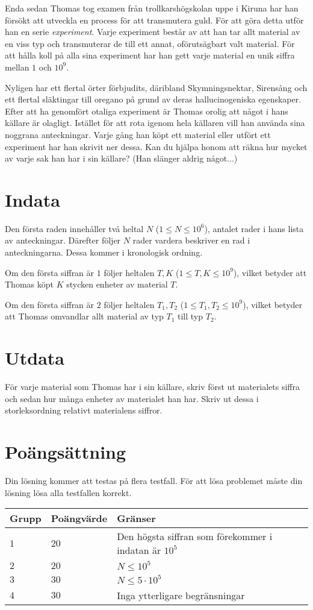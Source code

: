 Enda sedan Thomas tog examen från trollkarshögskolan uppe i Kiruna har han försökt att utveckla en process för att transmutera guld. För att göra detta utför
han en serie \textit{experiment}. Varje experiment består av att han tar allt material av en viss typ och transmuterar de till ett annat, oförutsägbart valt
material. För att hålla koll på alla sina experiment har han gett varje material en unik siffra mellan $1$ och $10^9$. 

Nyligen har ett flertal örter förbjudits, däribland Skymningsnektar, Sirensång och ett flertal släktingar till oregano på grund av deras
hallucinogeniska egenskaper. Efter att ha genomfört otaliga experiment är Thomas orolig att något i hans källare är olagligt. Istället för att rota
igenom hela källaren vill han använda sina noggrana anteckningar. Varje gång han köpt ett material eller utfört ett experiment har han skrivit ner dessa.
Kan du hjälpa honom att räkna hur mycket av varje sak han har i sin källare? (Han slänger aldrig något...)

\section*{Indata}
Den första raden innehåller två heltal $N$ ($1 \leq N \leq 10^6$), antalet rader i hans lista av anteckningar.
Därefter följer $N$ rader vardera beskriver en rad i anteckningarna. Dessa kommer i kronologisk ordning.

Om den första siffran är $1$ följer heltalen $T,K$ ($1 \leq T, K \leq 10^9$), vilket betyder att Thomas köpt $K$ stycken enheter av material $T$.

Om den första siffran är $2$ följer heltalen $T_1, T_2$ ($1 \leq T_1, T_2 \leq 10^9$), vilket betyder att Thomas omvandlar allt material av typ $T_1$ till typ $T_2$.


\section*{Utdata}
För varje material som Thomas har i sin källare, skriv först ut materialets siffra och sedan hur många enheter av materialet han har.
Skriv ut dessa i storleksordning relativt materialens siffror.

\section*{Poängsättning}
Din lösning kommer att testas på flera testfall.
\noindent
För att lösa problemet måste din lösning lösa alla testfallen korrekt.

\noindent
\begin{tabular}{| l | l | l |}
\hline
  Grupp & Poängvärde & Gränser \\ \hline
  $1$    & $20$       &  Den högsta siffran som förekommer i indatan är $10^5$ \\ \hline
  $2$    & $20$       &  $N \leq 10^5$ \\ \hline
  $3$    & $30$       &  $N \leq 5 \cdot 10^5$ \\ \hline
  $4$    & $30$       &  Inga ytterligare begränsningar \\ \hline
\end{tabular}
